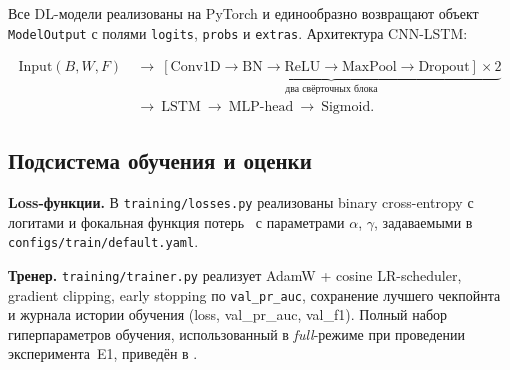 Все DL-модели реализованы на PyTorch и единообразно возвращают объект
\texttt{ModelOutput} с полями \texttt{logits}, \texttt{probs} и
\texttt{extras}. Архитектура CNN-LSTM:

\begin{equation*}
\begin{aligned}
\text{Input}(B, W, F)\ &\to\ \underbrace{[\text{Conv1D}\!\to\!\text{BN}\!\to\!\text{ReLU}\!\to\!\text{MaxPool}\!\to\!\text{Dropout}]\!\times\!2}_{\text{два свёрточных блока}}\\
&\to\ \text{LSTM}\ \to\ \text{MLP-head}\ \to\ \text{Sigmoid}.
\end{aligned}
\end{equation*}

\subsection{Подсистема обучения и оценки}

\textbf{Loss-функции.} В \texttt{training/losses.py} реализованы
binary cross-entropy с логитами и фокальная функция
потерь~\cite{lin2017focal} с параметрами \(\alpha\), \(\gamma\),
задаваемыми в \texttt{configs/train/default.yaml}.

\textbf{Тренер.} \texttt{training/trainer.py} реализует AdamW + cosine
LR-scheduler, gradient clipping, early stopping по
\texttt{val\_pr\_auc}, сохранение лучшего чекпойнта и журнала
истории обучения (loss, val\_pr\_auc, val\_f1). Полный набор
гиперпараметров обучения, использованный в \emph{full}-режиме при
проведении эксперимента~E1, приведён в .


